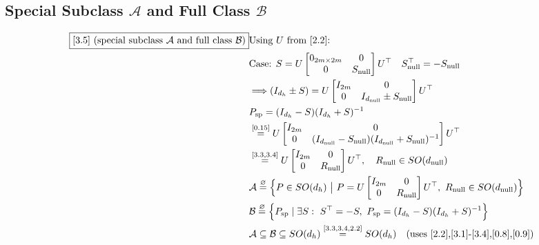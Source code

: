 \documentclass[11pt]{article}
\newcommand{\eqdef}{\overset{\varnothing}{=}}
\newcommand{\eqref}[1]{\overset{[#1]}{=}}
\begin{document}
\subsection{Special Subclass $\mathcal{A}$ and Full Class $\mathcal{B}$}

\begin{align}
\boxed{[3.5] \text{ (special subclass }\mathcal{A}\text{ and full class }\mathcal{B}\text{)}}
&\text{Using }U\text{ from [2.2]:} \notag\\
&\text{Case: }S
=
U
\begin{bmatrix}
0_{2m\times 2m} & 0\\
0 & S_{\mathrm{null}}
\end{bmatrix}
U^\top
\quad
S_{\mathrm{null}}^\top=-S_{\mathrm{null}} \notag\\
&\Longrightarrow
(I_{d_h}\pm S)
=
U
\begin{bmatrix}
I_{2m} & 0\\
0 & I_{d_{\mathrm{null}}}\pm S_{\mathrm{null}}
\end{bmatrix}
U^\top \notag\\
&P_{\mathrm{sp}}
=
(I_{d_h}-S)(I_{d_h}+S)^{-1} \notag\\
&\eqref{0.15}
U
\begin{bmatrix}
I_{2m} & 0\\
0 &
(I_{d_{\mathrm{null}}}-S_{\mathrm{null}})
(I_{d_{\mathrm{null}}}+S_{\mathrm{null}})^{-1}
\end{bmatrix}
U^\top \notag\\
&\eqref{3.3,3.4}
U
\begin{bmatrix}
I_{2m} & 0\\
0 & R_{\mathrm{null}}
\end{bmatrix}
U^\top
,\quad
R_{\mathrm{null}}\in SO(d_{\mathrm{null}}) \notag\\
&\mathcal{A}
\eqdef
\Big\{
P\in SO(d_h)
\ \big|\
P
=
U
\begin{bmatrix}
I_{2m} & 0\\
0 & R_{\mathrm{null}}
\end{bmatrix}
U^\top
,\
R_{\mathrm{null}}\in SO(d_{\mathrm{null}})
\Big\} \notag\\
&\mathcal{B}
\eqdef
\Big\{
P_{\mathrm{sp}}
\mid
\exists S:\ S^\top=-S,\
P_{\mathrm{sp}}
=(I_{d_h}-S)(I_{d_h}+S)^{-1}
\Big\} \notag\\
&\mathcal{A}
\subseteq
\mathcal{B}
\subseteq
SO(d_h)
\eqref{3.3,3.4,2.2}
SO(d_h)
\quad(\text{uses [2.2],[3.1]-[3.4],[0.8],[0.9]})
\end{align}
\end{document}
